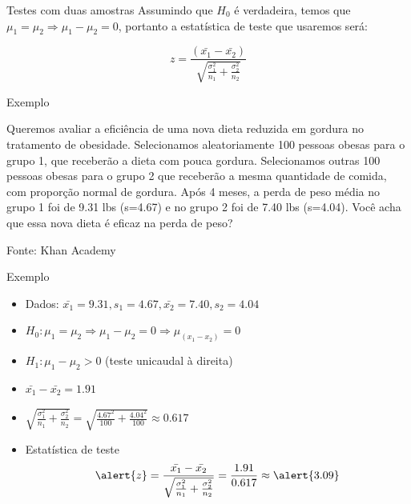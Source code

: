 \documentclass{beamer}
\begin{document}
\begin{frame}{Testes com duas amostras}
  Assumindo que $H_0$ é verdadeira, temos que $\mu_1=\mu_2 \Rightarrow
  \mu_1-\mu_2 = 0$, portanto a estatística de teste que usaremos será:

\begin{displaymath}
  z = \frac{ (\bar{x_1} - \bar{x_2}) }{\sqrt{\frac{\sigma_1^2}{n_1} + \frac{\sigma^2_2}{n_2}}}
\end{displaymath}

\end{frame}

\begin{frame}{Exemplo}
  \begin{example}
    Queremos avaliar a eficiência de uma nova dieta reduzida em
    gordura no tratamento de obesidade. Selecionamos aleatoriamente
    100 pessoas obesas para o grupo 1, que receberão a dieta com pouca
    gordura. Selecionamos outras 100 pessoas obesas para o grupo 2 que
    receberão a mesma quantidade de comida, com proporção normal de
    gordura. Após 4 meses, a perda de peso média no grupo 1 foi de
    9.31 lbs (s=4.67) e no grupo 2 foi de 7.40 lbs (s=4.04). Você acha
    que essa nova dieta é eficaz na perda de peso?
  \end{example}
  Fonte: Khan Academy
\end{frame}

\begin{frame}{Exemplo}
  \begin{example}
    \begin{itemize}
    \item Dados: $\bar{x_1}=9.31, s_1=4.67, \bar{x_2}=7.40, s_2 = 4.04$
    \item $H_0: \mu_1 = \mu_2 \Rightarrow \mu_1 - \mu_2 = 0 \Rightarrow \mu_{(x_1 - x_2)} = 0$
    \item $H_1: \mu_1 - \mu_2 > 0$ (teste unicaudal à direita)
    \item $\bar{x_1}-\bar{x_2}=1.91$
    \item $\sqrt{\frac{\sigma_1^2}{n_1} + \frac{\sigma^2_2}{n_2}} =
      \sqrt{\frac{4.67^2}{100} + \frac{4.04^2}{100}} \approx 0.617$
    \item Estatística de teste
      \begin{displaymath}
        \alert{z} = \frac{\bar{x_1}-\bar{x_2}}{\sqrt{\frac{\sigma_1^2}{n_1} +
            \frac{\sigma^2_2}{n_2}}} = \frac{1.91}{0.617} \approx \alert{3.09}
      \end{displaymath}
    \end{itemize}
  \end{example}
\end{frame}
\end{document}
